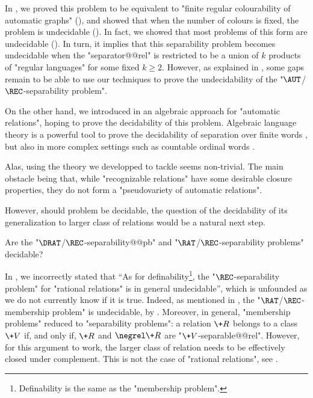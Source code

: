 \openProblemAutRecSeparability*

In , we proved this problem to be equivalent
to "finite regular colourability of automatic graphs" (),
and showed that when the number of colours is fixed, the problem is undecidable
().
In fact, we showed that most problems of this form are undecidable
().
In turn, it implies that this separability problem becomes
undecidable when the "separator@@rel" is restricted to be
a union of $k$ products of "regular languages" for some fixed $k\geq 2$.
However, as explained in , some gaps remain to be able to use
our techniques to prove the undecidability of the "$\AUT$/$\REC$-separability problem".

On the other hand, we introduced in  an algebraic approach for
"automatic relations", hoping to prove the decidability of this problem.
Algebraic language theory is a powerful tool to prove the decidability of separation
over finite words \cite{PlaceZeitoun2016SeparatingRegularLanguages},
but also in more complex settings such as countable ordinal words \cite{ColcombetGoolMorvan2022FOSeparation}.

Alas, using the theory we developped to tackle 
seems non-trivial. The main obstacle being that, while
"recognizable relations" have some desirable closure properties,
they do not form a "pseudovariety of automatic relations".

However, should  problem be decidable, the question of
the decidability of its generalization to larger class of relations would be
a natural next step.

\begin{openproblem}
	Are the "$\DRAT$/$\REC$-separability@@pb" and
	"$\RAT$/$\REC$-sepa\-ra\-bility problems" decidable?
\end{openproblem}

In \cite[\S~1]{BarceloFigueiraMorvan2023SeparatingAutomatic},
we incorrectly stated that ``As for definability\footnote{Definability is the same
as the "membership problem".}, the "$\REC$-separability problem" for "rational relations" is in general undecidable'', which is unfounded as we do not currently know if it is true.
Indeed, as mentioned in ,
the "$\RAT$/$\REC$-membership problem" is undecidable, by
\cite[\S~III, Theorem~8.4]{Berstel1979Transductions}.
Moreover, in general, "membership problems" reduced to "separability problems":
a relation $\+R$ belongs to a class $\+V$ if, and only if, $\+R$ and $\negrel \+R$
are "$\+V$-separable@@rel". However, for this argument to work, the larger class of relation
needs to be effectively closed under complement.
This is not the case of "rational relations", see .

